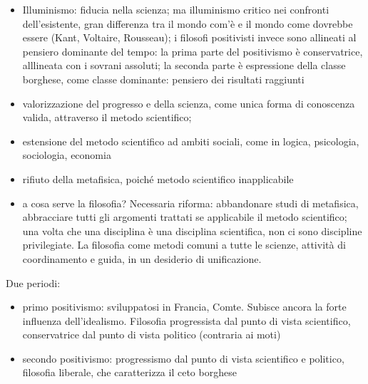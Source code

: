 \documentclass[letterpaper,10pt,italian]{jupyterBook}
\begin{document}
\sphinxAtStartPar
{}
\begin{itemize}
\item {} 
\sphinxAtStartPar
Illuminismo: fiducia nella scienza; ma illuminismo critico nei confronti dell’esistente, gran differenza tra il mondo com’è e il mondo come dovrebbe essere (Kant, Voltaire, Rousseau); i filosofi positivisti invece sono allineati al pensiero dominante del tempo: la prima parte del positivismo è conservatrice, alllineata con i sovrani assoluti; la seconda parte è espressione della classe borghese, come classe dominante: pensiero dei risultati raggiunti

\end{itemize}

\sphinxAtStartPar
{}
\begin{itemize}
\item {} 
\sphinxAtStartPar
valorizzazione del progresso e della scienza, come unica forma di conoscenza valida, attraverso il metodo scientifico;

\item {} 
\sphinxAtStartPar
estensione del metodo scientifico ad ambiti sociali, come in logica, psicologia, sociologia, economia

\item {} 
\sphinxAtStartPar
rifiuto della metafisica, poiché metodo scientifico inapplicabile

\item {} 
\sphinxAtStartPar
a cosa serve la filosofia? Necessaria riforma: abbandonare studi di metafisica, abbracciare tutti gli argomenti trattati se applicabile il metodo scientifico; una volta che una disciplina è una disciplina scientifica, non ci sono discipline privilegiate. La filosofia come metodi comuni a tutte le scienze, attività di coordinamento e guida, in un desiderio di unificazione.

\end{itemize}

\sphinxAtStartPar
Due periodi:
\begin{itemize}
\item {} 
\sphinxAtStartPar
primo positivismo: sviluppatosi in Francia, Comte. Subisce ancora la forte influenza dell’idealismo. Filosofia progressista dal punto di vista scientifico, conservatrice dal punto di vista politico (contraria ai moti)

\item {} 
\sphinxAtStartPar
secondo positivismo: progressismo dal punto di vista scientifico e politico, filosofia liberale, che caratterizza il ceto borghese

\end{itemize}
\end{document}

